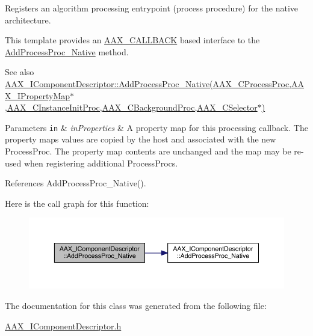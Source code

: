 Registers an algorithm processing entrypoint (process procedure) for the native architecture. 

This template provides an \hyperlink{a00149_aaa22112139aa627574b1ef562f579d43}{A\+A\+X\+\_\+\+C\+A\+L\+L\+B\+A\+C\+K} based interface to the \hyperlink{a00088_a1c069508cf54a523905c8160ebf628ad}{Add\+Process\+Proc\+\_\+\+Native} method.

\begin{DoxySeeAlso}{See also}
\hyperlink{a00088_a1c069508cf54a523905c8160ebf628ad}{A\+A\+X\+\_\+\+I\+Component\+Descriptor\+::\+Add\+Process\+Proc\+\_\+\+Native(\+A\+A\+X\+\_\+\+C\+Process\+Proc,\+A\+A\+X\+\_\+\+I\+Property\+Map$\ast$,\+A\+A\+X\+\_\+\+C\+Instance\+Init\+Proc,\+A\+A\+X\+\_\+\+C\+Background\+Proc,\+A\+A\+X\+\_\+\+C\+Selector$\ast$)}
\end{DoxySeeAlso}

\begin{DoxyParams}[1]{Parameters}
\mbox{\tt in}  & {\em in\+Properties} & A property map for this processing callback. The property map\textquotesingle{}s values are copied by the host and associated with the new Process\+Proc. The property map contents are unchanged and the map may be re-\/used when registering additional Process\+Procs. \\
\hline
\end{DoxyParams}


References Add\+Process\+Proc\+\_\+\+Native().



Here is the call graph for this function\+:
\nopagebreak
\begin{figure}[H]
\begin{center}
\leavevmode
\includegraphics[width=350pt]{a00088_a38f0d50814689dc720147de1dfd324d2_cgraph}
\end{center}
\end{figure}




The documentation for this class was generated from the following file\+:\begin{DoxyCompactItemize}
\item 
\hyperlink{a00237}{A\+A\+X\+\_\+\+I\+Component\+Descriptor.\+h}\end{DoxyCompactItemize}
